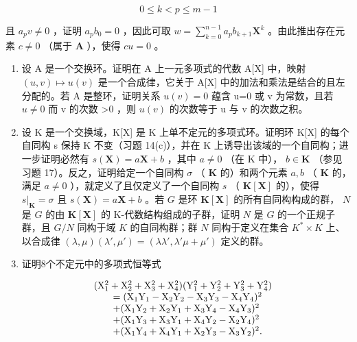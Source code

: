 \[
0 \leqslant k <   p \leqslant m - 1
\]

且 \(a_{p}v \neq 0\) ，证明 \(a_{p}b_{0} = 0\) ，因此可取 \(w = \sum_{k=0}^{n-1} a_{p}b_{k+1}\mathbf{X}^{k}\) 。由此推出存在元素 \(c \neq 0\) （属于 \(\mathbf{A}\) ），使得 \(cu = 0\) 。

\begin{enumerate}
\def\labelenumi{\arabic{enumi}.}
\setcounter{enumi}{16}
\item
  设 A 是一个交换环。证明在 A 上一元多项式的代数 A{[}X{]} 中，映射 \((u,v)\mapsto u(v)\) 是一个合成律，它关于 A{[}X{]} 中的加法和乘法是结合的且左分配的。若 A 是整环，证明关系 \(u(v)=0\) 蕴含 u=0 或 v 为常数，且若 \(u\neq0\) 而 v 的次数 \textgreater0 ，则 \(u(v)\) 的次数等于 u 与 v 的次数之积。
\item
  设 K 是一个交换域，K{[}X{]} 是 K 上单不定元的多项式环。证明环 K{[}X{]} 的每个自同构 s 保持 K 不变（习题 14(c)），并在 K 上诱导出该域的一个自同构；进一步证明必然有 \(s(\mathbf{X}) = a\mathbf{X} + b\) ，其中 \(a \neq 0\) （在 K 中）， \(b \in \mathbf{K}\) （参见习题 17）。反之，证明给定一个自同构 \(\sigma\) （ \(\mathbf{K}\) 的）和两个元素 \(a, b\) （ \(\mathbf{K}\) 的，满足 \(a \neq 0\) ），就定义了且仅定义了一个自同构 \(s\) （ \(\mathbf{K}[\mathbf{X}]\) 的），使得 \(s|_{\mathbf{K}} = \sigma\) 且 \(s(\mathbf{X}) = a\mathbf{X} + b\) 。若 \(G\) 是环 \(\mathbf{K}[\mathbf{X}]\) 的所有自同构构成的群， \(N\) 是 \(G\) 的由 \(\mathbf{K}[\mathbf{X}]\) 的 K-代数结构组成的子群，证明 \(N\) 是 \(G\) 的一个正规子群，且 \(G / N\) 同构于域 \(K\) 的自同构群；群 \(N\) 同构于定义在集合 \(K^* \times K\) 上、以合成律 \((\lambda, \mu)(\lambda', \mu') = (\lambda\lambda', \lambda' \mu + \mu')\) 定义的群。
\item
  证明8个不定元中的多项式恒等式
\end{enumerate}

\[
\begin{array}{r l} & (\mathrm{X} _ {1} ^ {2} + \mathrm{X} _ {2} ^ {2} + \mathrm{X} _ {3} ^ {2} + \mathrm{X} _ {4} ^ {2}) (\mathrm{Y} _ {1} ^ {2} + \mathrm{Y} _ {2} ^ {2} + \mathrm{Y} _ {3} ^ {2} + \mathrm{Y} _ {4} ^ {2}) \\ & \qquad = (\mathrm{X} _ {1} \mathrm{Y} _ {1} - \mathrm{X} _ {2} \mathrm{Y} _ {2} - \mathrm{X} _ {3} \mathrm{Y} _ {3} - \mathrm{X} _ {4} \mathrm{Y} _ {4}) ^ {2} \\ & \qquad + (\mathrm{X} _ {1} \mathrm{Y} _ {2} + \mathrm{X} _ {2} \mathrm{Y} _ {1} + \mathrm{X} _ {3} \mathrm{Y} _ {4} - \mathrm{X} _ {4} \mathrm{Y} _ {3}) ^ {2} \\ & \qquad + (\mathrm{X} _ {1} \mathrm{Y} _ {3} + \mathrm{X} _ {3} \mathrm{Y} _ {1} + \mathrm{X} _ {4} \mathrm{Y} _ {2} - \mathrm{X} _ {2} \mathrm{Y} _ {4}) ^ {2} \\ & \qquad + (\mathrm{X} _ {1} \mathrm{Y} _ {4} + \mathrm{X} _ {4} \mathrm{Y} _ {1} + \mathrm{X} _ {2} \mathrm{Y} _ {3} - \mathrm{X} _ {3} \mathrm{Y} _ {2}) ^ {2}. \end{array}
\]

